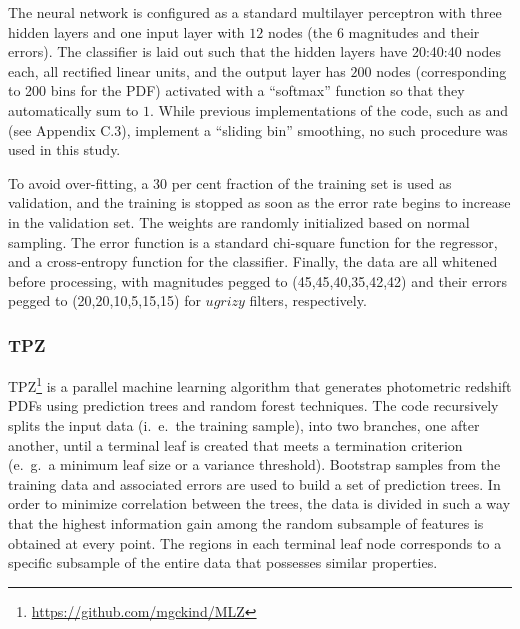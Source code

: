 The neural network is configured as a standard multilayer perceptron with three hidden layers and one input layer with $12$ nodes (the $6$ magnitudes and their errors).
The classifier is laid out such that the hidden layers have 20:40:40 nodes each, all rectified linear units, and the output layer has $200$ nodes (corresponding to 200 bins for the PDF) activated with a ``softmax'' function so that they automatically sum to $1$.  While previous implementations of the code, such as \citet{Sanchez:14} and \citet{Bonnett:15} (see Appendix C.3), implement a ``sliding bin'' smoothing, no such procedure was used in this study.

To avoid over-fitting, a $30$ per cent fraction of the training set is used as validation, and the training is stopped as soon as the error rate begins to increase in the validation set. The weights are randomly initialized based on normal sampling. The error function is a standard chi-square function for the regressor, and a cross-entropy function for the classifier. Finally, the data are all whitened before processing, with magnitudes pegged to (45,45,40,35,42,42) and their errors pegged to (20,20,10,5,15,15) for $ugrizy$ filters, respectively.


\subsubsection{TPZ}
\label{sec:tpz}

\textsc{TPZ}\footnote{\url{https://github.com/mgckind/MLZ}} \citep[Trees for Photo-$z$,][]{Carrasco_Kind:13,Carrascokind:14} is a parallel machine learning algorithm that generates photometric redshift PDFs using prediction trees and random forest techniques.
The code recursively splits the input data (i.~e.~the training sample), into two branches, one after another, until a terminal leaf is created that meets a termination criterion (e.~g.~a minimum leaf size or a variance threshold).
Bootstrap samples from the training data and associated errors are used to build a set of prediction trees.  In order to minimize correlation between the trees, the data is divided in such a way that the highest information gain among the random subsample of features is obtained at every point. The regions in each terminal leaf node corresponds to a specific subsample of the entire data that possesses similar properties.

